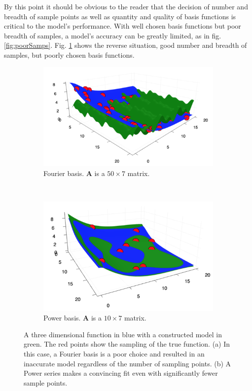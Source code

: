 \par By this point it should be obvious to the reader that the decision of number and breadth of sample points as well as quantity and quality of basis functions is critical to the model's performance. With well chosen basis functions but poor breadth of samples, a model's accuracy can be greatly limited, as in fig. \ref{fig:poorSamps}. Fig. \ref{fig:3dFourier} shows the reverse situation, good number and breadth of samples, but poorly chosen basis functions. 

\begin{figure}
  \centering
  \begin{subfigure}{0.85\textwidth}
    \includegraphics[width=\linewidth]{Figures/3dFourier}
    \caption{Fourier basis. $\mathbf{A}$ is a $50\times7$ matrix.} 
    \label{fig:3dFourier}
  \end{subfigure}%
  \\
  \begin{subfigure}{0.8\textwidth}
    \includegraphics[width=\linewidth]{Figures/3dPower}
    \caption{Power basis. $\mathbf{A}$ is a $10\times7$ matrix.} 
    \label{fig:3dPower}
  \end{subfigure}%
\caption{A three dimensional function in blue with a constructed model in green. The red points show the sampling of the true function. (a) In this case, a Fourier basis is a poor choice and resulted in an inaccurate model regardless of the number of sampling points. (b) A Power series makes a convincing fit even with significantly fewer sample points.} \label{fig:3dFit}
\end{figure}
